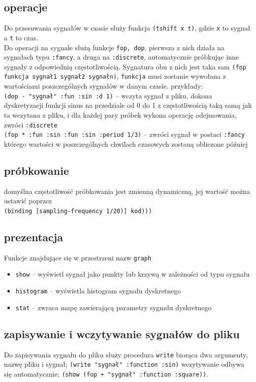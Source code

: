 \documentclass[12pt]{article}
\newcommand{\cljt}[1]{\texttt{#1}}
\begin{document}
\subsection{operacje}
Do przesuwania sygnałów w czasie służy funkcja \cljt{(tshift x t)}, gdzie \cljt{x} to sygnał a \cljt{t} to czas. \\
Do operacji na sygnale służą funkcje \cljt{fop, dop}, pierwsza z nich działa na sygnałach typu \cljt{:fancy}, a druga na \cljt{:discrete}, automatycznie próbkując inne sygnały z odpowiednią częstotliwością. Sygnatura obu z nich jest taka sam \cljt{(fop funkcja sygnał1 sygnał2 sygnałn)}, \cljt{funkcja} musi zostanie wywołana z wartościami poszczególnych sygnałów w danym czasie. przykłady: \\
\cljt{(dop - "sygnał" {:fun :sin :d 1})} -- wczyta sygnał z pliku, dokona dyskretyzacji funkcji sinus na przedziale od 0 do 1 z częstotliwością taką samą jak ta wczytana z pliku, i dla każdej pary próbek wykona operację odejmowania, zwróci \cljt{:discrete} \\
\cljt{(fop * {:fun :sin} {:fun :sin :period 1/3})} -- zwróci sygnał w postaci \cljt{:fancy} którego wartości w poszczególnych chwilach czasowych zostaną obliczone później
\subsection{próbkowanie}
domyślna częstotliwość próbkowania jest zmienną dynamiczną, jej wartość można ustawić poprzez \\
\cljt{(binding [sampling-frequency 1/20)] kod)))}

\subsection{prezentacja}
Funkcje znajdujące się w przestrzeni nazw \cljt{graph}
\begin{itemize}
	\item \cljt{show} -- wyświetl sygnał jako punkty lub krzywą w zależności od typu sygnału
	\item \cljt{histogram} -- wyświetla histogram sygnału dyskretnego
	\item \cljt{stat} -- zwraca mapę zawierającą parametry sygnału dyskretnego
\end{itemize}

\subsection{zapisywanie i wczytywanie sygnałów do pliku}
Do zapisywania sygnału do pliku służy procedura \cljt{write} biorąca dwa argumenty, nazwę pliku i sygnał;
\cljt{(write "sygnał" {:function :sin})}
wczytywanie odbywa się automatycznie;
\cljt{(show (fop + "sygnał" {:function :square}))}.
\newpage
\end{document}
